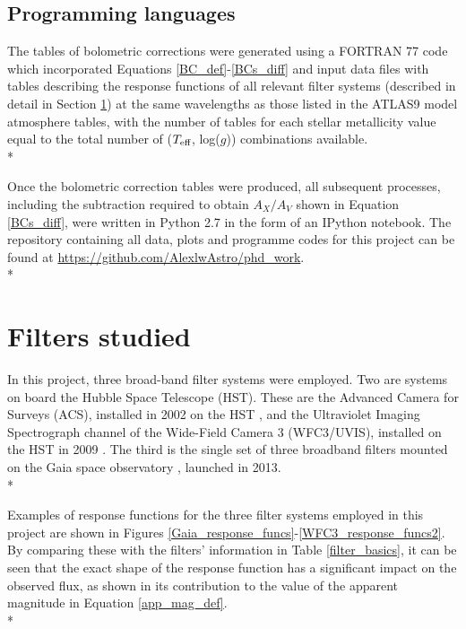 \documentclass[12pt, a4paper]{report}
\begin{document}
\subsection{Programming languages}
The tables of bolometric corrections were generated using a FORTRAN 77 code which incorporated Equations \ref{BC_def}-\ref{BCs_diff} and input data files with tables describing the response functions of all relevant filter systems (described in detail in Section \ref{filter_desc}) at the same wavelengths as those listed in the ATLAS9 model atmosphere tables, with the number of tables for each stellar metallicity value equal to the total number of ($T_{\textnormal{eff}}$, log($g$)) combinations available.\\*

Once the bolometric correction tables were produced, all subsequent processes, including the subtraction required to obtain $A_{X}/A_{V}$ shown in Equation \ref{BCs_diff}, were written in Python 2.7 in the form of an IPython notebook. The repository containing all data, plots and programme codes for this project can be found at \protect\url{https://github.com/AlexlwAstro/phd_work}.\\*

\section{Filters studied} \label{filter_desc}
In this project, three broad-band filter systems were employed. Two are systems on board the Hubble Space Telescope (HST). These are the Advanced Camera for Surveys (ACS), installed in 2002 on the HST \citep{2007AJ....133.1658S}, and the Ultraviolet Imaging Spectrograph channel of the Wide-Field Camera 3 (WFC3/UVIS), installed on the HST in 2009 \citep{2010wfc..rept...14K,2010SPIE.7731E..0ZM}. The third is the single set of three broadband filters mounted on the Gaia space observatory \citep{2010A&A...523A..48J}, launched in 2013. \\*

Examples of response functions for the three filter systems employed in this project are shown in Figures \ref{Gaia_response_funcs}-\ref{WFC3_response_funcs2}. By comparing these with the filters' information in Table \ref{filter_basics}, it can be seen that the exact shape of the response function has a significant impact on the observed flux, as shown in its contribution to the value of the apparent magnitude in Equation \ref{app_mag_def}.\\*
\end{document}

